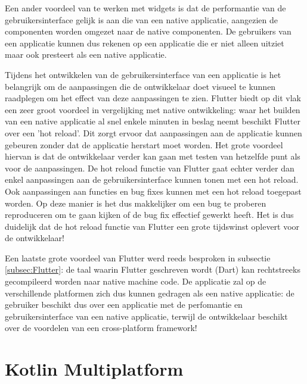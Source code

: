 Een ander voordeel van te werken met widgets is dat de performantie van de gebruikersinterface gelijk is aan die van een native applicatie, aangezien de componenten worden omgezet naar de native componenten. De gebruikers van een applicatie kunnen dus rekenen op een applicatie die er niet alleen uitziet maar ook presteert als een native applicatie.

Tijdens het ontwikkelen van de gebruikersinterface van een applicatie is het belangrijk om de aanpassingen die de ontwikkelaar doet visueel te kunnen raadplegen om het effect van deze aanpassingen te zien. Flutter biedt op dit vlak een zeer groot voordeel in vergelijking met native ontwikkeling: waar het builden van een native applicatie al snel enkele minuten in beslag neemt beschikt Flutter over een 'hot reload'. Dit zorgt ervoor dat aanpassingen aan de applicatie kunnen gebeuren zonder dat de applicatie herstart moet worden. Het grote voordeel hiervan is dat de ontwikkelaar verder kan gaan met testen van hetzelfde punt als voor de aanpassingen. De hot reload functie van Flutter gaat echter verder dan enkel aanpassingen aan de gebruikersinterface kunnen tonen met een hot reload. Ook aanpassingen aan functies en bug fixes kunnen met een hot reload toegepast worden. Op deze manier is het dus makkelijker om een bug te proberen reproduceren om te gaan kijken of de bug fix effectief gewerkt heeft. Het is dus duidelijk dat de hot reload functie van Flutter een grote tijdswinst oplevert voor de ontwikkelaar!

Een laatste grote voordeel van Flutter werd reeds besproken in subsectie \ref{subsec:Flutter}: de taal waarin Flutter geschreven wordt (Dart) kan rechtstreeks gecompileerd worden naar native machine code. De applicatie zal op de verschillende platformen zich dus kunnen gedragen als een native applicatie: de gebruiker beschikt dus over een applicatie met de perfomantie en gebruikersinterface van een native applicatie, terwijl de ontwikkelaar beschikt over de voordelen van een cross-platform framework!

\section{Kotlin Multiplatform}
\label{detailsKotlin}


